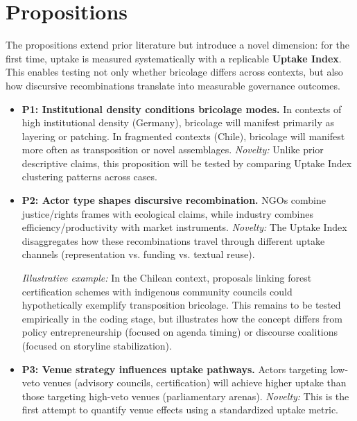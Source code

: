 
\section*{Propositions}

The propositions extend prior literature but introduce a novel dimension: for the 
first time, uptake is measured systematically with a replicable \textbf{Uptake Index}. 
This enables testing not only whether bricolage differs across contexts, but also 
how discursive recombinations translate into measurable governance outcomes.

\begin{itemize}
    \item \textbf{P1: Institutional density conditions bricolage modes.}  
    In contexts of high institutional density (Germany), bricolage will manifest 
    primarily as layering or patching. In fragmented contexts (Chile), bricolage 
    will manifest more often as transposition or novel assemblages.  
    \textit{Novelty:} Unlike prior descriptive claims, this proposition will be tested 
    by comparing Uptake Index clustering patterns across cases.

    \item \textbf{P2: Actor type shapes discursive recombination.}  
    NGOs combine justice/rights frames with ecological claims, while industry 
    combines efficiency/productivity with market instruments.  
    \textit{Novelty:} The Uptake Index disaggregates how these recombinations travel 
    through different uptake channels (representation vs. funding vs. textual reuse).

    \textit{Illustrative example:} In the Chilean context, proposals linking 
    forest certification schemes with indigenous community councils could 
    hypothetically exemplify transposition bricolage. This remains to be 
    tested empirically in the coding stage, but illustrates how the concept 
    differs from policy entrepreneurship (focused on agenda timing) or 
    discourse coalitions (focused on storyline stabilization).

    \item \textbf{P3: Venue strategy influences uptake pathways.}  
    Actors targeting low-veto venues (advisory councils, certification) will achieve 
    higher uptake than those targeting high-veto venues (parliamentary arenas).  
    \textit{Novelty:} This is the first attempt to quantify venue effects using a 
    standardized uptake metric.
\end{itemize}

